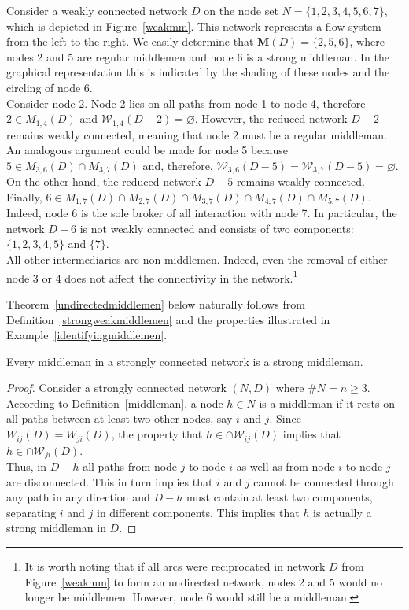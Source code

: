 \begin{example} \label{identifyingmiddlemen}
Consider a weakly connected network $D$ on the node set $N=\{1,2,3,4,5,6,7\}$, which is depicted in Figure~\ref{weakmm}. This network represents a flow system from the left to the right. We easily determine that $\mathbf M (D)=\{2,5,6\}$, where nodes 2 and 5 are regular middlemen and node 6 is a strong middleman. In the graphical representation this is indicated by the shading of these nodes and the circling of node $6$.
\\
Consider node 2. Node 2 lies on all paths from node 1 to node 4, therefore $2 \in M_{1,4}(D)$ and $\mathcal{W}_{1,4}(D - 2) = \varnothing$. However, the reduced network $D - 2$ remains weakly connected, meaning that node 2 must be a regular middleman.
\\
An analogous argument could be made for node 5 because $5 \in M_{3,6} (D) \cap M_{3,7} (D)$ and, therefore, $\mathcal{W}_{3,6}(D - 5) = \mathcal{W}_{3,7}(D - 5) = \varnothing$. On the other hand, the reduced network $D - 5$ remains weakly connected.
\\
Finally, $6 \in M_{1,7}(D) \cap M_{2,7}(D) \cap M_{3,7}(D) \cap M_{4,7}(D) \cap M_{5,7}(D)$. Indeed, node 6 is the sole broker of all interaction with node 7. In particular, the network $D - 6$ is not weakly connected and consists of two components: $\{ 1,2,3,4,5 \}$ and $\{ 7 \}$.
\\
All other intermediaries are non-middlemen. Indeed, even the removal of either node 3 or 4 does not affect the connectivity in the network.\footnote{It is worth noting that if all arcs were reciprocated in network $D$ from Figure~\ref{weakmm} to form an undirected network, nodes 2 and 5 would no longer be middlemen. However, node 6 would still be a middleman.}
\end{example}

\noindent
Theorem~\ref{undirectedmiddlemen} below naturally follows from Definition~\ref{strongweakmiddlemen} and the properties illustrated in Example~\ref{identifyingmiddlemen}.

\begin{theorem} \label{undirectedmiddlemen}
Every middleman in a strongly connected network is a strong middleman.
\end{theorem}

\begin{proof}
Consider a strongly connected network $(N,D)$ where $\# N =n \geqslant 3$. According to Definition~\ref{middleman}, a node $h \in N$ is a middleman if it rests on all paths between at least two other nodes, say $i$ and $j$. Since $W_{ij}(D) = W_{ji}(D)$, the property that $h \in \cap \mathcal{W}_{ij}(D)$ implies that $h \in \cap \mathcal{W}_{ji}(D)$.
\\
Thus, in $D - h$ all paths from node $j$ to node $i$ as well as from node $i$ to node $j$ are disconnected. This in turn implies that $i$ and $j$ cannot be connected through any path in any direction and $D - h$ must contain at least two components, separating $i$ and $j$ in different components. This implies that $h$ is actually a strong middleman in $D$.
\end{proof}

